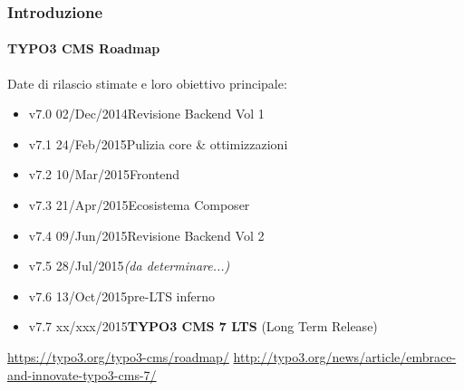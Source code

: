 
\begin{frame}[fragile]
	\frametitle{Introduzione}
	\framesubtitle{TYPO3 CMS Roadmap}

	Date di rilascio stimate e loro obiettivo principale:

	\begin{itemize}
		\item v7.0 \textrightarrow\tabto{1.3cm}02/Dec/2014\tabto{3.4cm}Revisione Backend Vol 1

		\item
			\begingroup
				\color{typo3orange}
					v7.1 \textrightarrow\tabto{1.3cm}24/Feb/2015\tabto{3.4cm}Pulizia core \& ottimizzazioni
			\endgroup

		\item v7.2 \textrightarrow\tabto{1.3cm}10/Mar/2015\tabto{3.4cm}Frontend
		\item v7.3 \textrightarrow\tabto{1.3cm}21/Apr/2015\tabto{3.4cm}Ecosistema Composer
		\item v7.4 \textrightarrow\tabto{1.3cm}09/Jun/2015\tabto{3.4cm}Revisione Backend Vol 2
		\item v7.5 \textrightarrow\tabto{1.3cm}28/Jul/2015\tabto{3.4cm}\textit{(da determinare...)}
		\item v7.6 \textrightarrow\tabto{1.3cm}13/Oct/2015\tabto{3.4cm}pre-LTS inferno
		\item v7.7 \textrightarrow\tabto{1.3cm}xx/xxx/2015\tabto{3.4cm}\textbf{TYPO3 CMS 7 LTS} (Long Term Release)
	\end{itemize}

	\smaller
		\url{https://typo3.org/typo3-cms/roadmap/}\newline
		\url{http://typo3.org/news/article/embrace-and-innovate-typo3-cms-7/}
	\normalsize

\end{frame}


